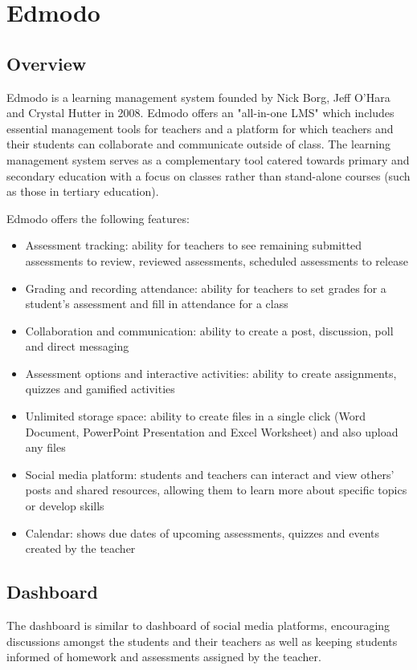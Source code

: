 \section{Edmodo}
\subsection{Overview}
Edmodo is a learning management system founded by Nick Borg, Jeff O'Hara and Crystal Hutter in 2008. Edmodo offers an "all-in-one LMS" which includes essential management tools for teachers and a platform for which teachers and their students can collaborate and communicate outside of class. The learning management system serves as a complementary tool catered towards primary and secondary education with a focus on classes rather than stand-alone courses (such as those in tertiary education)\cite{edmodoAbout}. 

Edmodo offers the following features\cite{edmodoLMS}:
\begin{itemize}
    \item Assessment tracking: ability for teachers to see remaining submitted assessments to review, reviewed assessments, scheduled assessments to release
    \item Grading and recording attendance: ability for teachers to set grades for a student's assessment and fill in attendance for a class
    \item Collaboration and communication: ability to create a post, discussion, poll and direct messaging
    \item Assessment options and interactive activities: ability to create assignments, quizzes and gamified activities\cite{edmodoGamification}
    \item Unlimited storage space: ability to create files in a single click (Word Document, PowerPoint Presentation and Excel Worksheet) and also upload any files
    \item Social media platform: students and teachers can interact and view others' posts and shared resources, allowing them to learn more about specific topics or develop skills
    \item Calendar: shows due dates of upcoming assessments, quizzes and events created by the teacher
\end{itemize}

\subsection{Dashboard}
The dashboard is similar to dashboard of social media platforms, encouraging discussions amongst the students and their teachers as well as keeping students informed of homework and assessments assigned by the teacher.

